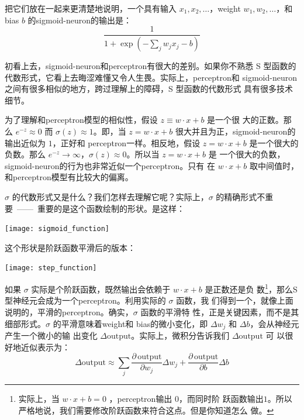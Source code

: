 把它们放在一起来更清楚地说明，一个具有输入 $x_1,x_2,\ldots$，\gls*{weight}
$w_1,w_2,\ldots$，和\gls*{bias} $b$ 的\gls*{sigmoid-neuron}的输出是：
\begin{equation}
  \frac{1}{1+\exp(-\sum_j w_j x_j-b)}
  \label{eq:4}\tag{4}
\end{equation}

初看上去，\gls*{sigmoid-neuron}和\gls*{perceptron}有很大的差别。如果你不熟悉 S
型函数的代数形式，它看上去晦涩难懂又令人生畏。实际上，\gls*{perceptron}和%
\gls*{sigmoid-neuron}之间有很多相似的地方，跨过理解上的障碍，S 型函数的代数形式
具有很多技术细节。

为了理解和\gls*{perceptron}模型的相似性，假设 $z \equiv w \cdot x + b$ 是一个很
大的正数。那么 $e^{-z} \approx 0$ 而 $\sigma(z) \approx 1$。即，当 $z = w \cdot
x+b$ 很大并且为正，\gls*{sigmoid-neuron}的输出近似为 $1$，正好和%
\gls*{perceptron}一样。相反地，假设 $z = w \cdot x+b$ 是一个很大的负数。那么
$e^{-z} \rightarrow \infty$，$\sigma(z) \approx 0$。所以当 $z = w \cdot x +b$ 是
一个很大的负数，\gls*{sigmoid-neuron}的行为也非常近似一个\gls*{perceptron}。只有
在 $w \cdot x+b$ 取中间值时，和\gls*{perceptron}模型有比较大的偏离。

$\sigma$ 的代数形式又是什么？我们怎样去理解它呢？实际上，$\sigma$ 的精确形式不重
要~——~重要的是这个函数绘制的形状。是这样：
\begin{center}
  \texttt{[image: sigmoid\_function]}
  \label{fig:SigmoidFunction}
\end{center}

这个形状是阶跃函数平滑后的版本：
\begin{center}
  \texttt{[image: step\_function]}
  \label{fig:StepFunction}
\end{center}

如果 $\sigma$ 实际是个阶跃函数，既然输出会依赖于 $w\cdot x+b$ 是正数还是负
数\footnote{实际上，当 $w \cdot x +b = 0$ ，\gls*{perceptron}输出 $0$，而同时阶
  跃函数输出$1$。所以严格地说，我们需要修改阶跃函数来符合这点。但是你知道怎么
  做。}，那么S型神经元会成为一个\gls*{perceptron}。利用实际的 $\sigma$ 函数，我
们得到一个，就像上面说明的，平滑的\gls*{perceptron}。确实，$\sigma$ 函数的平滑特
性，正是关键因素，而不是其细部形式。$\sigma$ 的平滑意味着\gls*{weight}和%
\gls*{bias}的微小变化，即 $\Delta w_j$ 和 $\Delta b$，会从神经元产生一个微小的输
出变化 $\Delta \mbox{output}$。实际上，微积分告诉我们 $\Delta \mbox{output}$ 可
以很好地近似表示为：
\begin{equation}
  \Delta \mbox{output} \approx \sum_j \frac{\partial \, \mbox{output}}{\partial w_j}
  \Delta w_j + \frac{\partial \, \mbox{output}}{\partial b} \Delta b
  \label{eq:5}\tag{5}
\end{equation}

